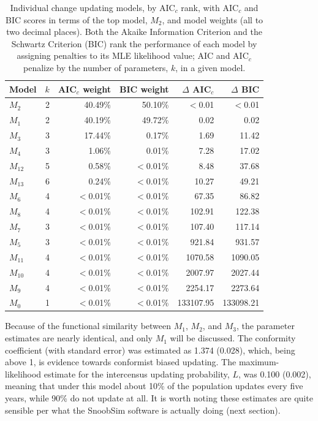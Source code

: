  
\begin{table}[htbp]
  \centering
    \begin{tabular}{lrrrrr}
  	\hline
  	\hline
    Model & $k$ & AIC$_c$ weight & BIC weight & $\Delta$ AIC$_c$ & $\Delta$ BIC \\
   	\hline
    $M_2$  & 2     & 40.49\% & 50.10\% & $<$0.01  & $<$0.01 \\
    $M_1$  & 2     & 40.19\% & 49.72\% & 0.02  & 0.02 \\
    $M_3$  & 3     & 17.44\% & 0.17\% & 1.69  & 11.42 \\
    $M_4$  & 3     & 1.06\% & 0.01\% & 7.28  & 17.02 \\
    $M_{12}$ & 5     & 0.58\% & $<$0.01\% & 8.48  & 37.68 \\
    $M_{13}$ & 6     & 0.24\% & $<$0.01\% & 10.27 & 49.21 \\
    $M_6$  & 4     & $<$0.01\% & $<$0.01\% & 67.35 & 86.82 \\
    $M_8$  & 4     & $<$0.01\% & $<$0.01\% & 102.91 & 122.38 \\
    $M_7$  & 3     & $<$0.01\% & $<$0.01\% & 107.40 & 117.14 \\
    $M_5$  & 3     & $<$0.01\% & $<$0.01\% & 921.84 & 931.57 \\
    $M_{11}$ & 4     & $<$0.01\% & $<$0.01\% & 1070.58 & 1090.05 \\
    $M_{10}$ & 4     & $<$0.01\% & $<$0.01\% & 2007.97 & 2027.44 \\
    $M_9$  & 4     & $<$0.01\% & $<$0.01\% & 2254.17 & 2273.64 \\
    $M_0$  & 1     & $<$0.01\% & $<$0.01\% & 133107.95 & 133098.21 \\
    \hline
    \end{tabular}%
    \caption{Individual change updating models, by AIC$_c$ rank, with AIC$_c$ and BIC scores in terms of the top model, $M_2$, and model weights (all to two decimal places).  Both the Akaike Information Criterion and the Schwartz Criterion (BIC) rank the performance of each model by assigning penalties to its MLE likelihood value; AIC and AIC$_c$ penalize by the number of parameters, $k$, in a given model.}
  \label{tab:ichangemodels}%
\end{table}%

Because of the functional similarity between $M_1$, $M_2$, and $M_3$, the parameter estimates are nearly identical, and only $M_1$ will be discussed.  The conformity coefficient (with standard error) was estimated as 1.374 (0.028), which, being above 1, is evidence towards conformist biased updating.  The maximum-likelihood estimate for the intercensus updating probability, $L$, was 0.100 (0.002), meaning that under this model about 10\% of the population updates every five years, while 90\% do not update at all.  It is worth noting these estimates are quite sensible per what the SnoobSim software is actually doing (next section).

